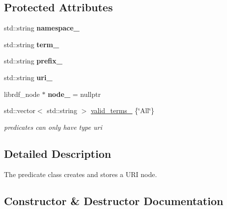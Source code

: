 \subsection*{Protected Attributes}
\begin{DoxyCompactItemize}
\item 
\mbox{\label{classomexmeta_1_1Predicate_afc79b0cc43eb11e4bc2fe0b305e551bc}} 
std\+::string {\bfseries namespace\+\_\+}
\item 
\mbox{\label{classomexmeta_1_1Predicate_ab626a5fd9fa8f302767d4ca544a9eff2}} 
std\+::string {\bfseries term\+\_\+}
\item 
\mbox{\label{classomexmeta_1_1Predicate_a5dfbbc85f7bdc5a3e4da72913f6ce306}} 
std\+::string {\bfseries prefix\+\_\+}
\item 
\mbox{\label{classomexmeta_1_1Predicate_a4fe359b93a9dea9b60f7bc28c1aa913b}} 
std\+::string {\bfseries uri\+\_\+}
\item 
\mbox{\label{classomexmeta_1_1Predicate_ad0548a6d31dbc6f32734032b1540e58f}} 
librdf\+\_\+node $\ast$ {\bfseries node\+\_\+} = nullptr
\item 
\mbox{\label{classomexmeta_1_1Predicate_a14ae7768fbd3aaf444bcde8650910c0b}} 
std\+::vector$<$ std\+::string $>$ \hyperlink{classomexmeta_1_1Predicate_a14ae7768fbd3aaf444bcde8650910c0b}{valid\+\_\+terms\+\_\+} \{\char`\"{}All\char`\"{}\}
\begin{DoxyCompactList}\small\item\em predicates can only have type uri \end{DoxyCompactList}\end{DoxyCompactItemize}


\subsection{Detailed Description}
The predicate class creates and stores a U\+RI node. 

\subsection{Constructor \& Destructor Documentation}
\mbox{\label{classomexmeta_1_1Predicate_ad5a91eb29204202d2f18816d09677622}} 
